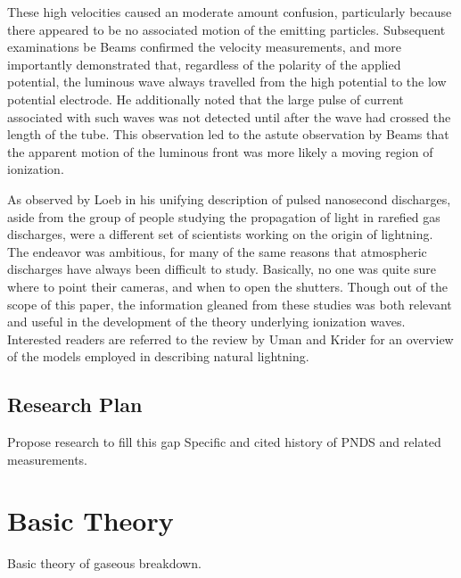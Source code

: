 These high velocities caused an moderate amount confusion, particularly because
there appeared to be no associated motion of the emitting particles. Subsequent
examinations be Beams \cite{Beams1930} confirmed the velocity measurements, and
more importantly demonstrated that, regardless of the polarity of the applied
potential, the luminous wave always travelled from the high potential to the low
potential electrode. He additionally noted that the large pulse of current
associated with such waves was not detected until after the wave had crossed the
length of the tube. This observation led to the astute observation by Beams that
the apparent motion of the luminous front was more likely a moving region of
ionization.

As observed by Loeb \cite{Loeb1965} in his unifying description of pulsed
nanosecond discharges, aside from the group of people studying the propagation
of light in rarefied gas discharges, were a different set of scientists working
on the origin of lightning. The endeavor was ambitious, for many of the same
reasons that atmospheric discharges have always been difficult to study.
Basically, no one was quite sure where to point their cameras, and when to open
the shutters. Though out of the scope of this paper, the information gleaned
from these studies was both relevant and useful in the development of the theory
underlying ionization waves. Interested readers are referred to the review by
Uman and Krider \cite{Uman1982} for an overview of the models employed in
describing natural lightning.



\subsection{Research Plan}

Propose research to fill this gap
Specific and cited history of PNDS and related measurements.

\section{Basic Theory}

Basic theory of gaseous breakdown.
